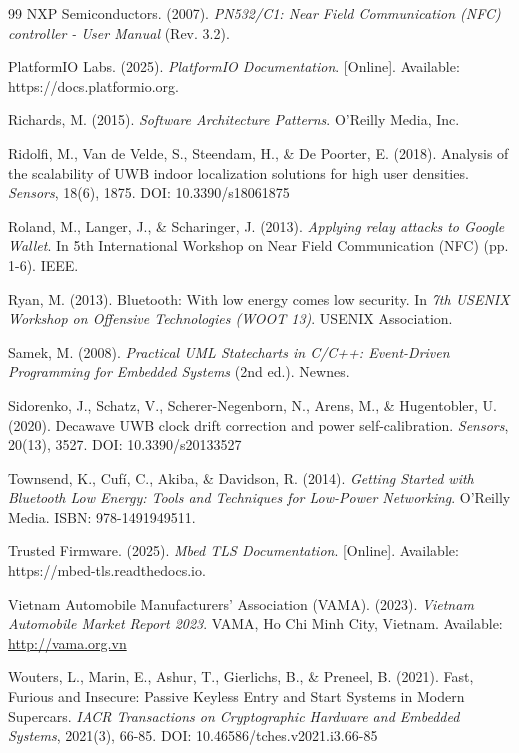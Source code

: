 \begin{thebibliography}{99}
NXP Semiconductors. (2007). \textit{PN532/C1: Near Field Communication (NFC) controller - User Manual} (Rev. 3.2).

PlatformIO Labs. (2025). \textit{PlatformIO Documentation}. [Online]. Available: https://docs.platformio.org.

Richards, M. (2015). \textit{Software Architecture Patterns}. O'Reilly Media, Inc.

Ridolfi, M., Van de Velde, S., Steendam, H., \& De Poorter, E. (2018). Analysis of the scalability of UWB indoor localization solutions for high user densities. \textit{Sensors}, 18(6), 1875. DOI: 10.3390/s18061875

Roland, M., Langer, J., \& Scharinger, J. (2013). \textit{Applying relay attacks to Google Wallet}. In 5th International Workshop on Near Field Communication (NFC) (pp. 1-6). IEEE.

Ryan, M. (2013). Bluetooth: With low energy comes low security. In \textit{7th USENIX Workshop on Offensive Technologies (WOOT 13)}. USENIX Association.

Samek, M. (2008). \textit{Practical UML Statecharts in C/C++: Event-Driven Programming for Embedded Systems} (2nd ed.). Newnes.

Sidorenko, J., Schatz, V., Scherer-Negenborn, N., Arens, M., \& Hugentobler, U. (2020). Decawave UWB clock drift correction and power self-calibration. \textit{Sensors}, 20(13), 3527. DOI: 10.3390/s20133527

Townsend, K., Cufí, C., Akiba, \& Davidson, R. (2014). \textit{Getting Started with Bluetooth Low Energy: Tools and Techniques for Low-Power Networking}. O'Reilly Media. ISBN: 978-1491949511.

Trusted Firmware. (2025). \textit{Mbed TLS Documentation}. [Online]. Available: https://mbed-tls.readthedocs.io.

Vietnam Automobile Manufacturers' Association (VAMA). (2023). \textit{Vietnam Automobile Market Report 2023}. VAMA, Ho Chi Minh City, Vietnam. Available: \url{http://vama.org.vn}

Wouters, L., Marin, E., Ashur, T., Gierlichs, B., \& Preneel, B. (2021). Fast, Furious and Insecure: Passive Keyless Entry and Start Systems in Modern Supercars. \textit{IACR Transactions on Cryptographic Hardware and Embedded Systems}, 2021(3), 66-85. DOI: 10.46586/tches.v2021.i3.66-85


\end{thebibliography}
